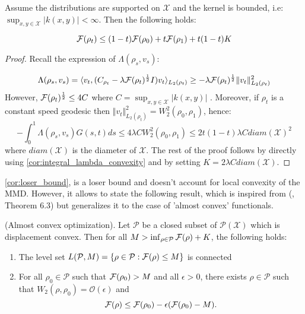 %
\begin{corollary}
\label{cor:loser_bound}Assume the distributions are supported on
$\mathcal{X}$ and the kernel is bounded, i.e: $\sup_{x,y\in\mathcal{X}}\vert k(x,y)\vert<\infty$.
Then the following holds:

\[
{{\mathcal F}}(\rho_{t})\leq(1-t){{\mathcal F}}(\rho_{0})+t{{\mathcal F}}(\rho_{1})+t(1-t)K
\]
\end{corollary}
%
\begin{proof}
Recall the expression of $\Lambda(\rho_{s},v_{s}):$

\[
\Lambda(\rho_{s},v_{s})=\langle v_{t},(C_{\rho_{t}}-\lambda {{\mathcal F}}(\rho_{t})^\frac{1}{2} I)v_{t}\rangle_{L_{2}(\rho_{t})}\geq-\lambda {{\mathcal F}}(\rho_{t})^\frac{1}{2}\Vert v_{t}\Vert_{L_{2}(\rho_{t})}^{2}
\]
However, ${{\mathcal F}}(\rho_{t})^\frac{1}{2}\leq4C$ where $C=\sup_{x,y\in\mathcal{X}}\vert k(x,y)\vert$
. Moreover, if $\rho_{t}$ is a constant speed geodesic then $\Vert v_{t}\Vert_{L_{2}(\rho_{t})}^{2}=W_{2}^{2}(\rho_{0},\rho_{1})$,
hence: 
\[
-\int_{0}^{1}\Lambda(\rho_{s},v_{s})G(s,t)ds\leq4\lambda CW_{2}^{2}(\rho_{0},\rho_{1})\leq2t(1-t)\lambda Cdiam(\mathcal{X})^{2}
\]
where $diam(\mathcal{X})$ is the diameter of $\mathcal{X}$. The rest of the proof follows by directly using \cref{cor:integral_lambda_convexity}
and by setting $K=2\lambda Cdiam(\mathcal{X})$.
\end{proof}
%
\cref{cor:loser_bound}, is a loser bound and doesn't account for local
convexity of the MMD. However, it allows to state the following result,
which is inspired from (\cite{Bottou:2017}, Theorem 6.3) but generalizes
it to the case of 'almost convex' functionals.
\begin{proposition}
\label{prop:almost_convex_optimization}
(Almost convex optimization). Let $\mathcal{P}$ be a closed subset
of $\mathcal{P}(\mathcal{X})$ which is displacement convex. Then
for all $M>\inf_{\rho\in\mathcal{P}}{{\mathcal F}}(\rho)+K$, the following
holds:
\end{proposition}
\begin{enumerate}
\item The level set $L(\mathcal{P},M)=\{\rho\in\mathcal{P}:{{\mathcal F}}(\rho)\leq M\}$
is connected
\item For all $\rho_{0}\in\mathcal{P}$ such that ${{\mathcal F}}(\rho_0)>M$
and all $\epsilon>0$, there exists $\rho\in\mathcal{P}$ such that
$W_{2}(\rho,\rho_{0})=\mathcal{O}(\epsilon)$ and
\[
{{\mathcal F}}(\rho)\leq {{\mathcal F}}(\rho_{0})-\epsilon({{\mathcal F}}(\rho_{0})-M).
\]
\end{enumerate}
